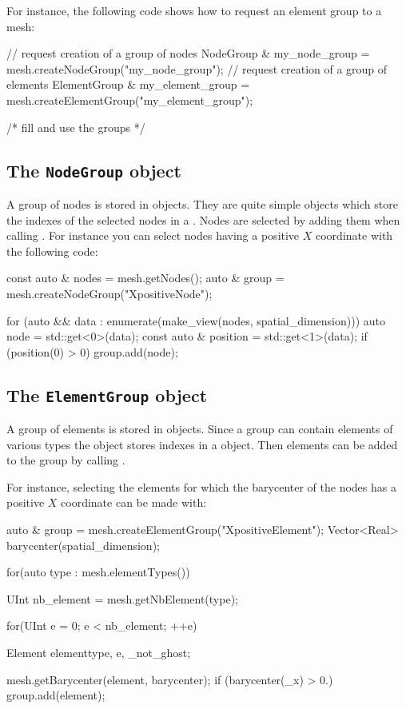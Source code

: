 For instance, the following code shows how to request
an element group to a mesh:

\begin{cpp}
  // request creation of a group of nodes
  NodeGroup & my_node_group = mesh.createNodeGroup("my_node_group");
  // request creation of a group of elements
  ElementGroup & my_element_group = mesh.createElementGroup("my_element_group");

  /* fill and use the groups */
\end{cpp}


\subsection{The \texttt{NodeGroup} object}
A group of nodes is stored in  objects.
They are quite simple objects which store the indexes
of the selected nodes in a .
Nodes are selected by adding them when calling
. For instance you can select nodes
having a positive $X$ coordinate with the following code:
\begin{cpp}
  const auto & nodes = mesh.getNodes();
  auto & group = mesh.createNodeGroup("XpositiveNode");

  for (auto && data : enumerate(make_view(nodes, spatial_dimension))){
    auto node = std::get<0>(data);
    const auto & position = std::get<1>(data);
    if (position(0) > 0) group.add(node);
  }
\end{cpp}

\subsection{The \texttt{ElementGroup} object}
A group of elements is stored in  objects.
Since a group can contain elements of various types
the  object stores indexes in
a  object.
Then elements can be added to the group by calling .

For instance, selecting the elements for which the barycenter of the nodes
has a positive $X$ coordinate can be made with:

\begin{cpp}
  auto & group = mesh.createElementGroup("XpositiveElement");
  Vector<Real> barycenter(spatial_dimension);

  for(auto type : mesh.elementTypes()){
    UInt nb_element  = mesh.getNbElement(type);

    for(UInt e = 0; e < nb_element; ++e) {
      Element element{type, e, _not_ghost};

      mesh.getBarycenter(element, barycenter);
      if (barycenter(_x) > 0.) group.add(element);
    }
  }
\end{cpp}

